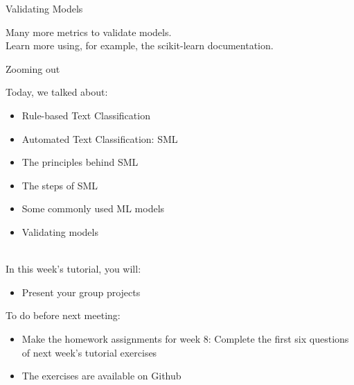 \documentclass[handout]{beamer}
\begin{document}
\begin{frame}{Validating Models}
	
	Many more metrics to validate models. \\
	
	Learn more using, for example, the scikit-learn documentation. 
	
\end{frame}



\begin{frame}{Zooming out} 
	
Today, we talked about:
\begin{itemize}
	\item Rule-based Text Classification
	\item Automated Text Classification: SML
	\item The principles behind SML
	\item The steps of SML
	\item Some commonly used ML models
	\item Validating models \\\
\end{itemize}

In this week's tutorial, you will:
\begin{itemize}
	\item Present your group projects
\end{itemize}
	
\end{frame}


\begin{frame}
	
To do before next meeting:
	\begin{itemize}
		\item Make the homework assignments for week 8: Complete the first six questions of next week's tutorial exercises
		\item The exercises are available on Github
	\end{itemize}
	
\end{frame}



	
\end{document}
